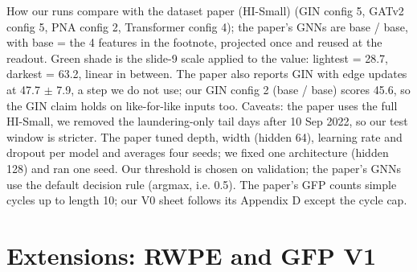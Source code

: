 \documentclass[aspectratio=169,10pt,t]{beamer}
\begin{document}
\begin{frame}{How our runs compare with the dataset paper (HI-Small)}
{        (GIN config 5, GATv2 config 5, PNA config 2, Transformer config 4); the paper's GNNs are
        base / base, with base = the 4 features in the footnote, projected once and reused at the
        readout. Green shade is the slide-9 scale applied to the value: lightest = 28.7, darkest =
        63.2, linear in between. The paper also reports GIN with edge updates at 47.7 $\pm$ 7.9, a
        step we do not use; our GIN config 2 (base / base) scores 45.6, so the GIN claim holds on
        like-for-like inputs too.
        Caveats: the paper uses the full HI-Small, we removed the laundering-only tail days after
        10 Sep 2022, so our test window is stricter. The paper tuned depth, width (hidden 64),
        learning rate and dropout per model and averages four seeds; we fixed one architecture
        (hidden 128) and ran one seed. Our threshold is chosen on validation; the paper's GNNs use
        the default decision rule (argmax, i.e. 0.5). The paper's GFP counts simple cycles up to
        length 10; our V0 sheet follows its Appendix D except the cycle cap.}
\end{frame}

\section{Extensions: RWPE and GFP V1}
\end{document}
